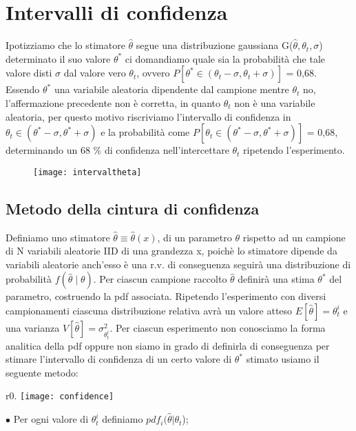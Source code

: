 \section{Intervalli di confidenza}

Ipotizziamo che lo stimatore $\hat{\theta}$ segue una distribuzione gaussiana G($\hat{\theta},\theta_t,\sigma$) determinato il suo valore $\theta^*$ ci domandiamo quale sia la probabilit\`{a} che tale valore disti $\sigma$ dal valore vero $\theta_t$, ovvero $P[\theta^* \in (\theta_t - \sigma, \theta_t + \sigma)]$ = 0,68. Essendo $\theta^*$ una variabile aleatoria dipendente dal campione mentre $\theta_t$ no, l'affermazione precedente non \`{e} corretta, in quanto $\theta_t$ non \`{e} una variabile aleatoria, per questo motivo riscriviamo l'intervallo di confidenza in $ \theta_t \in (\theta^* - \sigma,\theta^* + \sigma)$ e la probabilit\`{a} come $P[\theta_t \in (\theta^* - \sigma, \theta^* + \sigma)]$ = 0,68, determinando un 68 \% di confidenza nell'intercettare $\theta_t$ ripetendo l'esperimento.
\begin{figure}[ht]
\vspace{0.1in}
\texttt{[image: intervaltheta]}	
\centering
\end{figure}

\subsection{Metodo della cintura di confidenza}

Definiamo uno stimatore $\hat{\theta} \equiv \hat{\theta}(x)$, di un parametro $\theta$ rispetto ad un campione di N variabili aleatorie IID di una grandezza x, poich\`{e} lo stimatore dipende da variabili aleatorie anch'esso \`{e} una r.v. di conseguenza seguir\`{a} una distribuzione di probabilit\`{a} $f(\hat{\theta} \;\vert \; \theta)$. Per ciascun campione raccolto $\hat{\theta}$ definir\`{a} una stima $\theta^*$ del parametro, costruendo la pdf associata. Ripetendo l'esperimento con diversi campionamenti ciascuna distribuzione relativa  avr\`{a} un valore atteso $E[\hat{\theta}] = \theta_{t}^{i}$ e una varianza $V[\hat{\theta}] = \sigma_{\theta_{t}^i}^2$.\newline
Per ciascun esperimento non conosciamo la forma analitica della pdf oppure non siamo in grado di definirla di conseguenza per stimare l'intervallo di confidenza di un certo valore di $\theta^*$ stimato usiamo il seguente metodo:
\newline
\begin{wrapfigure}{r}{0.\textwidth}
\centering
\texttt{[image: confidence]}	
\end{wrapfigure}
$\bullet$ Per ogni valore di $\theta_{t}^i$ definiamo $pdf_i(\hat{\theta} \vert \theta_t$);\newline

